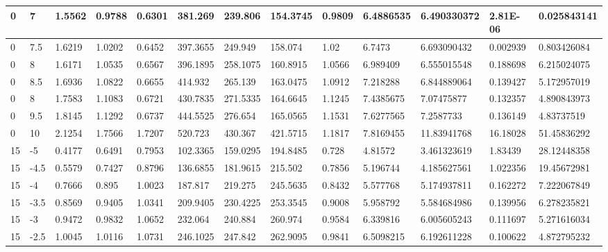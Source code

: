\begin{longtable}{|l|l|l|l|l|l|l|l|l|l|l|l|l|}
0     & 7     & 1.5562  & 0.9788  & 0.6301  & 381.269  & 239.806  & 154.3745 & 0.9809   & 6.4886535   & 6.490330372    & 2.81E-06                 & 0.025843141 \\ \hline
0     & 7.5   & 1.6219  & 1.0202  & 0.6452  & 397.3655 & 249.949  & 158.074  & 1.02     & 6.7473      & 6.693090432    & 0.002939                 & 0.803426084 \\ \hline
0     & 8     & 1.6171  & 1.0535  & 0.6567  & 396.1895 & 258.1075 & 160.8915 & 1.0566   & 6.989409    & 6.555015548    & 0.188698                 & 6.215024075 \\ \hline
0     & 8.5   & 1.6936  & 1.0822  & 0.6655  & 414.932  & 265.139  & 163.0475 & 1.0912   & 7.218288    & 6.844889064    & 0.139427                 & 5.172957019 \\ \hline
0     & 8     & 1.7583  & 1.1083  & 0.6721  & 430.7835 & 271.5335 & 164.6645 & 1.1245   & 7.4385675   & 7.07475877     & 0.132357                 & 4.890843973 \\ \hline
0     & 9.5   & 1.8145  & 1.1292  & 0.6737  & 444.5525 & 276.654  & 165.0565 & 1.1531   & 7.6277565   & 7.2587733      & 0.136149                 & 4.83737519  \\ \hline
0     & 10    & 2.1254  & 1.7566  & 1.7207  & 520.723  & 430.367  & 421.5715 & 1.1817   & 7.8169455   & 11.83941768    & 16.18028                 & 51.45836292 \\ \hline
15    & -5    & 0.4177  & 0.6491  & 0.7953  & 102.3365 & 159.0295 & 194.8485 & 0.728    & 4.81572     & 3.461323619    & 1.83439                  & 28.12448358 \\ \hline
15    & -4.5  & 0.5579  & 0.7427  & 0.8796  & 136.6855 & 181.9615 & 215.502  & 0.7856   & 5.196744    & 4.185627561    & 1.022356                 & 19.45672981 \\ \hline
15    & -4    & 0.7666  & 0.895   & 1.0023  & 187.817  & 219.275  & 245.5635 & 0.8432   & 5.577768    & 5.174937811    & 0.162272                 & 7.222067849 \\ \hline
15    & -3.5  & 0.8569  & 0.9405  & 1.0341  & 209.9405 & 230.4225 & 253.3545 & 0.9008   & 5.958792    & 5.584684986    & 0.139956                 & 6.278235821 \\ \hline
15    & -3    & 0.9472  & 0.9832  & 1.0652  & 232.064  & 240.884  & 260.974  & 0.9584   & 6.339816    & 6.005605243    & 0.111697                 & 5.271616034 \\ \hline
15    & -2.5  & 1.0045  & 1.0116  & 1.0731  & 246.1025 & 247.842  & 262.9095 & 0.9841   & 6.5098215   & 6.192611228    & 0.100622                 & 4.872795232 \\ \hline

\end{longtable}
